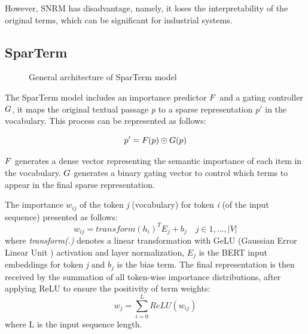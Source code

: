 \documentclass[
    twocolumn,
]{ceurart}
\begin{document}
    However, SNRM has disadvantage, namely, it loses the interpretability of the original terms,
    which can be significant for industrial systems.

    \subsection{SparTerm}

    \begin{figure}[h]
        \centering
        \def\svgwidth{\columnwidth}
        
        \caption{General architecture of SparTerm model}
    \end{figure}
    The SparTerm model includes an importance predictor $\mathnormal{F}$ and a gating controller
    $\mathnormal{G}$, it maps the original textual passage \emph{p} to a sparse representation
    $p'$ in the vocabulary.
    This process can be represented as follows:

    \begin{equation}
        \label{eqn:sparterm:mapping-process}
        p' = \mathnormal{F}(p) \odot \mathnormal{G}(p)
    \end{equation}

    $\mathnormal{F}$ generates a dense vector representing the semantic importance of each item
    in the vocabulary. $\mathnormal{G}$ generates a binary gating vector to control which terms
    to appear in the final sparse representation.

    The importance $w_{ij}$ of the token \emph{j} (vocabulary) for token \emph{i} (of the input
    sequence) presented as follows:
    \begin{equation}
        w_{ij}=transform(h_i)^T E_j + b_j \quad j \in {1, ..., |V|}
    \end{equation}
    where \emph{transform(.)} denotes a linear transformation with GeLU
    (Gaussian Error Linear Unit \cite{hendrycks2016gelu}) activation and layer normalization,
    $E_j$ is the BERT input embeddings for token \emph{j} and $b_j$ is the bias term.
    The final representation is then received by the summation of all token-wise importance
    distributions, after applying ReLU to ensure the positivity of term weights:
    \begin{equation}
        \label{eqn:sparterm:importance-predictor}
        w_j=\sum_{i=0}^L ReLU(w_{ij})
    \end{equation}
    where L is the input sequence length.
\end{document}
